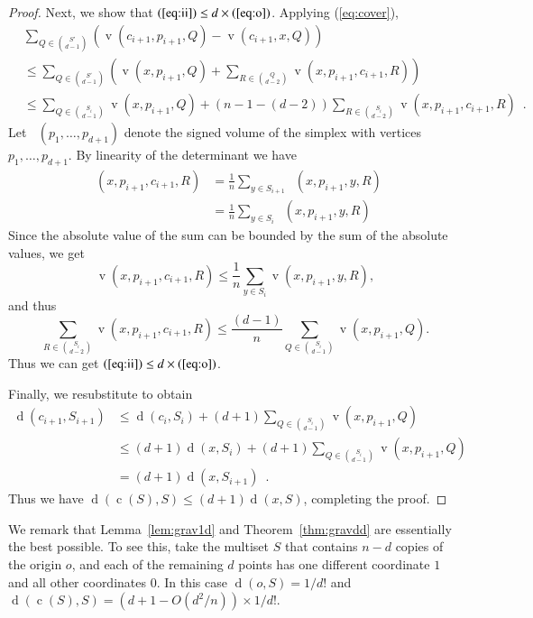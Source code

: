 \documentclass[preprint, 12pt]{elsarticle}
\DeclareMathOperator{\od}{d}
\DeclareMathOperator{\vol}{v}
\DeclareMathOperator{\cog}{c}
\DeclareMathOperator{\svol}{\bar{\vol}}
\begin{document}
\begin{proof}
Next, we show that $(\ref{eq:ii}) \le d\times (\ref{eq:o})$. Applying (\ref{eq:cover}),
\[
  \begin{aligned}
     & \!\!\! \sum_{Q\in \binom{S'}{d-1}}
           (\vol(c_{i+1},p_{i+1},Q)- \vol(c_{i+1},x,Q)) \\
     &\le  \sum_{Q\in \binom{S'}{d-1}} 
           \left(\vol(x,p_{i+1},Q) + \sum_{R \in \binom{Q}{d-2}} \vol(x,p_{i+1},c_{i+1},R)\right) \\
     &\le  \sum_{Q \in \binom{S_i}{d-1}}  \vol(x,p_{i+1}, Q) + (n-1 - (d-2)) \sum_{R \in \binom{S_i}{d-2}} \vol(x,p_{i+1},c_{i+1},R) \enspace .
  \end{aligned}
\]
Let $\svol(p_1, \ldots, p_{d+1})$ denote the signed volume of the simplex with vertices $p_1, \ldots, p_{d+1}$. By linearity of the determinant we have
\[
  \begin{aligned}
    \svol(x,p_{i+1},c_{i+1},R) & = \frac{1}{n} \sum_{y \in S_{i+1}} \svol(x,p_{i+1},y,R) \\
  & = \frac{1}{n} \sum_{y \in S_{i}} \svol(x,p_{i+1},y,R)
  \end{aligned}
\]
Since the absolute value of the sum can be bounded by the sum of the absolute values, we get
\[
\vol(x,p_{i+1},c_{i+1},R) \le \frac{1}{n} \sum_{y \in S_{i}} \vol(x,p_{i+1},y,R),
\]
and thus
\[
\sum_{R \in \binom{S_i}{d-2}} \vol(x,p_{i+1},c_{i+1},R) \leq \frac{(d-1)}{n}\sum_{Q \in \binom{S_i}{d-1}}  \vol(x,p_{i+1}, Q).
\]
Thus we can get $(\ref{eq:ii}) \le d\times (\ref{eq:o})$.


Finally, we resubstitute to obtain
\[
  \begin{aligned}
     \od(c_{i+1},S_{i+1})
     &\le \od(c_{i},S_{i}) + (d+1) \sum_{Q\in\binom{S_i}{d-1}} \vol(x,p_{i+1},Q)\\
     &\le (d+1) \od(x,S_{i}) + (d+1) \sum_{Q\in\binom{S_i}{d-1}} \vol(x,p_{i+1},Q) \\
     & = (d+1) \od(x,S_{i+1})  \enspace .
  \end{aligned}
\]
Thus we have $\od(\cog(S),S) \le (d+1)\od(x,S)$, completing the proof.
\end{proof}

We remark that Lemma~\ref{lem:grav1d} and Theorem~\ref{thm:gravdd} are essentially the best possible. To see this, take the multiset $S$ that contains $n-d$ copies of the origin $o$, and each of the remaining $d$ points has one different coordinate $1$ and all other coordinates $0$. In this case $\od(o, S)= 1/d!$ and $\od(\cog(S), S)= (d + 1 - O(d^2/n))\times 1/d!$.
\end{document}

